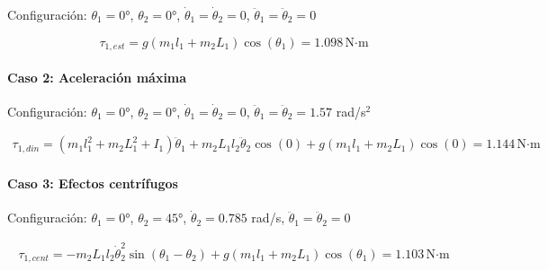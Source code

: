 Configuración: $\theta_1 = 0°$, $\theta_2 = 0°$, $\dot{\theta}_1 = \dot{\theta}_2 = 0$, $\ddot{\theta}_1 = \ddot{\theta}_2 = 0$

\begin{equation}
\tau_{1,est} = g(m_1l_1 + m_2L_1)\cos(\theta_1) 
= 1.098 \, \text{N·m}
\end{equation}

\paragraph{Caso 2: Aceleración máxima}

Configuración: $\theta_1 = 0°$, $\theta_2 = 0°$, $\dot{\theta}_1 = \dot{\theta}_2 = 0$, $\ddot{\theta}_1 = \ddot{\theta}_2 = 1.57$ rad/s$^2$

\begin{multline}
\tau_{1,din} = (m_1l_1^2 + m_2L_1^2 + I_1)\ddot{\theta}_1 + m_2L_1l_2\ddot{\theta}_2\cos(0) + g(m_1l_1 + m_2L_1)\cos(0)
= 1.144 \, \text{N·m}
\end{multline}

\paragraph{Caso 3: Efectos centrífugos}

Configuración: $\theta_1 = 0°$, $\theta_2 = 45°$, $\dot{\theta}_2 = 0.785$ rad/s, $\ddot{\theta}_1 = \ddot{\theta}_2 = 0$

\begin{multline}
\tau_{1,cent} = - m_2L_1l_2\dot{\theta}_2^2\sin(\theta_1 - \theta_2) + g(m_1l_1 + m_2L_1)\cos(\theta_1)
= 1.103 \, \text{N·m}
\end{multline}

